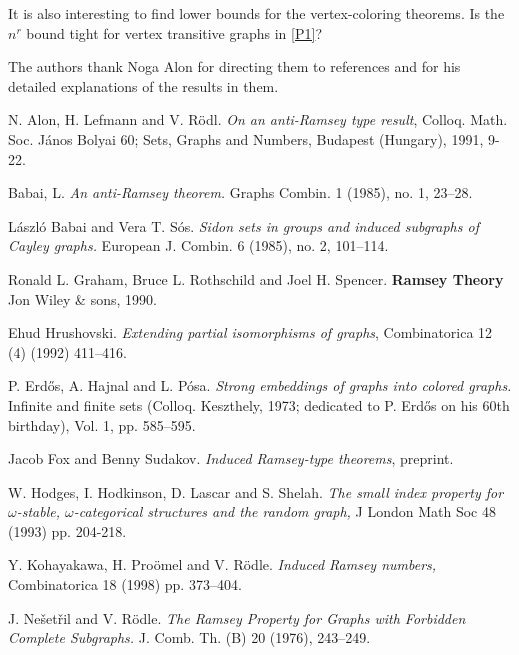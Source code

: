 \documentclass[11pt]{amsart}
\begin{document}
It is also interesting to find lower bounds for the
vertex-coloring theorems. Is the $n^r$ bound tight for vertex
transitive graphs in \ref{P1}? 


\bigskip
The authors  thank Noga Alon for directing  them to references
\cite{ALR,B,BS,FS} and  for his  detailed explanations of the
results in them.


\begin{thebibliography}{99}

 N. Alon, H. Lefmann and V. R\"odl.
{\sl On an anti-Ramsey type result}, Colloq. Math. Soc. J\'anos
Bolyai 60; Sets, Graphs and Numbers, Budapest (Hungary), 1991,
9-22.


 Babai, L.
{\sl An anti-Ramsey theorem.} Graphs Combin. 1 (1985), no. 1,
23--28.


 L\'aszl\'o Babai and  Vera T. S\'os.
{\sl Sidon sets in groups and induced subgraphs of Cayley graphs.}
European J. Combin. 6 (1985), no. 2, 101--114.



 Ronald L. Graham, Bruce L. Rothschild and Joel
  H. Spencer. {\bf Ramsey Theory} Jon Wiley \& sons, 1990.

 Ehud Hrushovski. {\sl Extending partial isomorphisms of
  graphs}, Combinatorica  12 (4) (1992) 411--416.

 P. Erd\H os, A. Hajnal and L.  P\'osa. {\sl Strong
    embeddings of graphs into colored graphs.} Infinite and finite
  sets (Colloq. Keszthely, 1973; dedicated to P. Erd\H os on his 60th
  birthday), Vol. 1, pp. 585--595.

 Jacob Fox and Benny Sudakov. {\sl Induced Ramsey-type
    theorems}, preprint.


 W. Hodges, I. Hodkinson, D. Lascar and S. Shelah. {\sl The
    small index property for $\omega $-stable, $\omega$-categorical
    structures and the random graph,} J London Math Soc 48 (1993)
    pp. 204-218.

 Y. Kohayakawa, H. Pro\"omel and V. R\"odle. {\sl Induced
    Ramsey numbers,} Combinatorica 18 (1998) pp. 373--404.

 J. Ne\v set\v ril and V. R\"odle. {\sl The Ramsey
    Property for Graphs with Forbidden Complete Subgraphs.}
  J. Comb. Th. (B) 20 (1976), 243--249.



\end{thebibliography}
\end{document}
